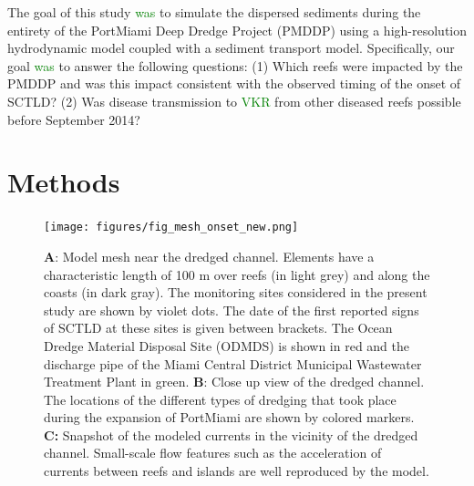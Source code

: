 \documentclass[preprint,12pt,authoryear]{elsarticle}
\newcommand{\modif}[1]{\textcolor{green}{#1}}
\begin{document}
The goal of this study \modif{was} to simulate the dispersed sediments during the entirety of the PortMiami Deep Dredge Project (PMDDP) using a high-resolution hydrodynamic model coupled with a sediment transport model. Specifically, our goal \modif{was} to answer the following questions: (1) Which reefs were impacted by the PMDDP and was this impact consistent with the observed timing of the onset of SCTLD?  (2) Was disease transmission to \modif{VKR} from other diseased reefs possible before September 2014? 

\section{Methods}

\begin{figure}
	\centering
	\texttt{[image: figures/fig\_mesh\_onset\_new.png]}
	\caption{\textbf{A}: Model mesh near the dredged channel. Elements have a characteristic length of 100 m over reefs (in light grey) and along the coasts (in dark gray). The monitoring sites considered in the present study are shown by violet dots. The date of the first reported signs of SCTLD at these sites is given between brackets. The Ocean Dredge Material Disposal Site (ODMDS) is shown in red and the discharge pipe of the Miami Central District Municipal Wastewater Treatment Plant in green. \textbf{B}: Close up view of the dredged channel. The locations of the different types of dredging that took place during the expansion of PortMiami are shown by colored markers. \textbf{C:} Snapshot of the modeled currents in the vicinity of the dredged channel. Small-scale flow features such as the acceleration of currents between reefs and islands are well reproduced by the model.}
	\label{fig:onset_mesh}
\end{figure}
\end{document}
